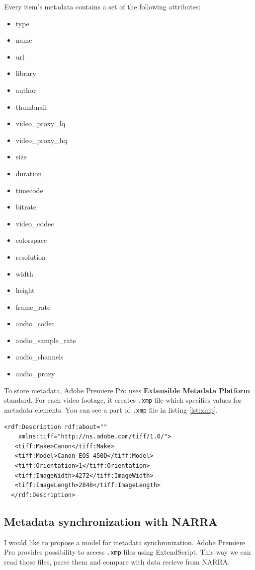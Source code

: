 \documentclass[thesis=B,english]{FITthesis}[2012/10/20]
\begin{document}
Every item's metadata contains a set of the following attributes:
	\begin{itemize}
		\item type
		\item name
		\item url
		\item library
		\item author
		\item thumbnail
		\item video\_proxy\_lq
		\item video\_proxy\_hq
		\item size
		\item duration
		\item timecode
		\item bitrate
		\item video\_codec
		\item colorspace
		\item resolution
		\item width
		\item height
		\item frame\_rate
		\item audio\_codec
		\item audio\_sample\_rate
		\item audio\_channels
		\item audio\_proxy
	\end{itemize}
To store metadata, Adobe Premiere Pro uses \textbf{Extensible Metadata Platform} standard. For each video footage, it creates \texttt{.xmp} file which specifies values for metadata elements. You can see a part of \texttt{.xmp} file in listing \ref{lst:xmp}.
\begin{lstlisting}[caption=Part of XMP file, label=lst:xmp]
<rdf:Description rdf:about=""
    xmlns:tiff="http://ns.adobe.com/tiff/1.0/">
   <tiff:Make>Canon</tiff:Make>
   <tiff:Model>Canon EOS 450D</tiff:Model>
   <tiff:Orientation>1</tiff:Orientation>
   <tiff:ImageWidth>4272</tiff:ImageWidth>
   <tiff:ImageLength>2848</tiff:ImageLength>
  </rdf:Description>
\end{lstlisting}

\subsection{Metadata synchronization with NARRA}
I would like to propose a model for metadata synchronization. Adobe Premiere Pro provides possibility to access \texttt{.xmp} files using ExtendScript. This way we can read those files, parse them and compare with data recieve from NARRA.
\end{document}
